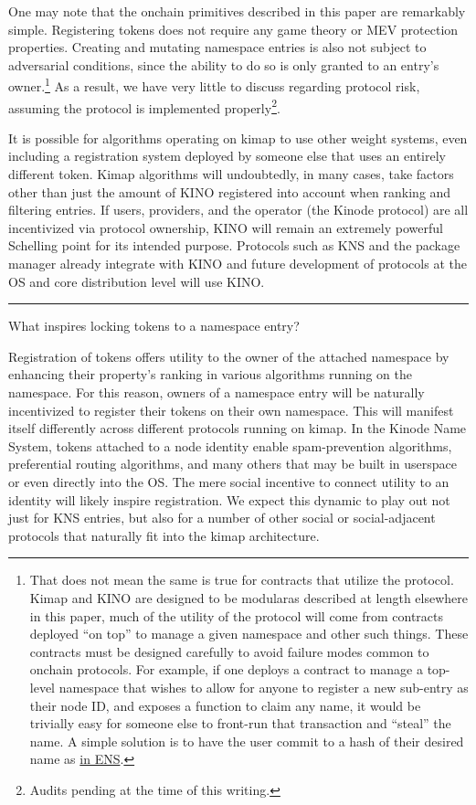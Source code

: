\documentclass[runningheads]{llncs}
\begin{document}
One may note that the onchain primitives described in this paper are remarkably simple.
Registering tokens does not require any game theory or MEV protection properties.
Creating and mutating namespace entries is also not subject to adversarial conditions, since the ability to do so is only granted to an entry's owner.\footnote{That does not mean the same is true for contracts that utilize the protocol.
Kimap and KINO are designed to be modular\textemdash as described at length elsewhere in this paper, much of the utility of the protocol will come from contracts deployed ``on top'' to manage a given namespace and other such things.
These contracts must be designed carefully to avoid failure modes common to onchain protocols.
For example, if one deploys a contract to manage a top-level namespace that wishes to allow for anyone to register a new sub-entry as their node ID, and exposes a function to claim any name, it would be trivially easy for someone else to front-run that transaction and ``steal'' the name.
A simple solution is to have the user commit to a hash of their desired name as \href{https://docs.ens.domains/registry/eth\#commit-reveal}{in ENS}.}
As a result, we have very little to discuss regarding protocol risk, assuming the protocol is implemented properly\footnote{Audits pending at the time of this writing.}.

It is possible for algorithms operating on kimap to use other weight systems, even including a registration system deployed by someone else that uses an entirely different token.
Kimap algorithms will undoubtedly, in many cases, take factors other than just the amount of KINO registered into account when ranking and filtering entries.
If users, providers, and the operator (the Kinode protocol) are all incentivized via protocol ownership, KINO will remain an extremely powerful Schelling point for its intended purpose.
Protocols such as KNS and the package manager already integrate with KINO and future development of protocols at the OS and core distribution level will use KINO.

\begin{center}
\noindent\rule{8cm}{0.4pt}
\end{center}

What inspires locking tokens to a namespace entry?

Registration of tokens offers utility to the owner of the attached namespace by enhancing their property's ranking in various algorithms running on the namespace.
For this reason, owners of a namespace entry will be naturally incentivized to register their tokens on their own namespace.
This will manifest itself differently across different protocols running on kimap.
In the Kinode Name System, tokens attached to a node identity enable spam-prevention algorithms, preferential routing algorithms, and many others that may be built in userspace or even directly into the OS.
The mere social incentive to connect utility to an identity will likely inspire registration.
We expect this dynamic to play out not just for KNS entries, but also for a number of other social or social-adjacent protocols that naturally fit into the kimap architecture.
\end{document}
